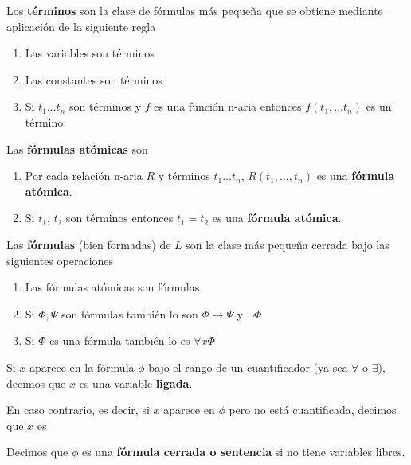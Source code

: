 \begin{defn}[Término]
Los \textbf{términos} son la clase de fórmulas más pequeña que se obtiene mediante aplicación de la siguiente regla
\begin{enumerate}
\item Las variables son términos
\item Las constantes son términos
\item Si $t_1...t_n$ son términos y $f$ es una función n-aria entonces $f(t_1,...t_n)$ es un término.
\end{enumerate}
\end{defn}

\begin{defn}
Las \textbf{fórmulas atómicas} son 
\begin{enumerate}
\item Por cada relación n-aria $R$ y términos $t_1...t_n$, $R(t_1,...,t_n)$ es una \textbf{fórmula atómica}.
\item Si $t_1$, $t_2$ son términos entonces $t_1=t_2$ es una \textbf{fórmula atómica}.
\end{enumerate}
\end{defn}

\begin{defn}
Las \textbf{fórmulas} (bien formadas) de $L$ son la clase más pequeña cerrada bajo las siguientes operaciones
\begin{enumerate}
\item Las fórmulas atómicas son fórmulas
\item Si $\Phi,\Psi$ son fórmulas también lo son $\Phi \to \Psi$ y $\neg \Phi$
\item Si $\Phi$ es una fórmula también lo es $\forall x \Phi$
\end{enumerate}
\end{defn}

\begin{defn}
Si $x$ aparece en la fórmula $\phi$ bajo el rango de un cuantificador (ya sea $\forall$ o $\exists$), decimos que $x$ es una variable \textbf{ligada}.

En caso contrario, es decir, si $x$ aparece en $\phi$ pero no está cuantificada, decimos que $x$ es 
\end{defn}

\begin{defn}
Decimos que $\phi$ es una \textbf{fórmula cerrada o sentencia} si no tiene variables libres.
\end{defn}

